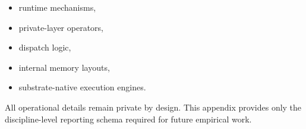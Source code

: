 \begin{itemize}
    \item runtime mechanisms,
    \item private-layer operators,
    \item dispatch logic,
    \item internal memory layouts,
    \item substrate-native execution engines.
\end{itemize}

All operational details remain private by design. This appendix provides only the 
discipline-level reporting schema required for future empirical work.

